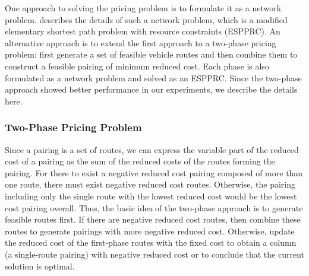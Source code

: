\documentclass[11pt]{article}
\begin{document}
One approach to solving the pricing problem is to formulate it as a network problem. 
\cite{Akca2} describes the details of such a network problem, which is 
a modified elementary shortest path problem with resource constraints (ESPPRC). 
An alternative approach is to extend the first approach to a two-phase pricing problem: first generate a set of feasible 
vehicle routes and then combine them to construct a feasible pairing of minimum reduced cost. 
Each phase is also formulated as a network problem and solved as an ESPPRC. Since the 
two-phase approach showed better performance in our experiments, we describe the details here.

\subsubsection{Two-Phase Pricing Problem}
Since a pairing is a set of routes, we can express the variable
 part of the reduced cost of a pairing 
as the sum of the reduced costs of the routes 
forming the pairing. For there to exist a negative reduced cost pairing 
composed of more than one route, there must exist negative reduced cost routes.
Otherwise, the pairing including only the single route with the lowest reduced
cost would be the lowest cost pairing overall.  
Thus, the basic idea of the
two-phase approach is to generate feasible routes first. 
If there are negative reduced cost routes, then combine these routes to generate 
pairings with more negative reduced cost.  Otherwise, update the reduced 
cost of the first-phase routes with the fixed cost to obtain a column (a single-route pairing) with negative 
reduced cost or to conclude that the current solution is optimal.  
\end{document}
